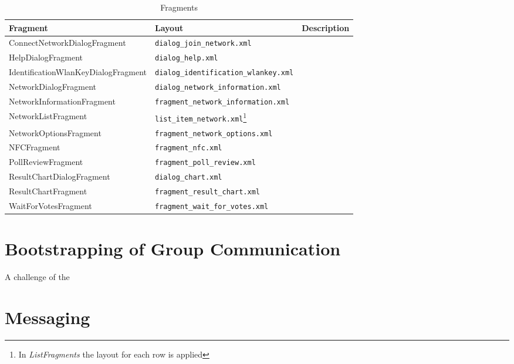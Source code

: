 \documentclass[numbers=noenddot, abstract=on, a4paper, headsepline,
footsepline, oneside, draft=off]{scrreprt}
\begin{document}
\begin{table}[htbp]
	\centering
	\begin{minipage}{\linewidth}
	\begin{tabularx}{\textwidth}{llX}
		\toprule
		\textbf{Fragment}						& \textbf{Layout}				& 	\textbf{Description}			\\
		\midrule
		ConnectNetworkDialogFragment			& \texttt{dialog\_join\_network.xml}			& 	\\
		HelpDialogFragment						& \texttt{dialog\_help.xml}						& 	\\
		IdentificationWlanKeyDialogFragment		& \texttt{dialog\_identification\_wlankey.xml}	&	\\
		NetworkDialogFragment					& \texttt{dialog\_network\_information.xml}		&	\\
		NetworkInformationFragment				& \texttt{fragment\_network\_information.xml}	&	\\
		NetworkListFragment						& \texttt{list\_item\_network.xml}\footnote{In
		\emph{ListFragments} the layout for each row is applied} 								&	\\
		NetworkOptionsFragment					& \texttt{fragment\_network\_options.xml}		& 	\\
		NFCFragment								& \texttt{fragment\_nfc.xml}					&	\\
		PollReviewFragment						& \texttt{fragment\_poll\_review.xml}			&	\\
		ResultChartDialogFragment				& \texttt{dialog\_chart.xml}					&	\\
		ResultChartFragment						& \texttt{fragment\_result\_chart.xml}			&	\\
		WaitForVotesFragment					& \texttt{fragment\_wait\_for\_votes.xml}		&	\\
		\bottomrule
	\end{tabularx}
	\end{minipage}
	\caption{Fragments}
	\label{tab:fragments}
\end{table}

\section{Bootstrapping of Group Communication}
\label{sec:bootstraping}
A challenge of the 


\section{Messaging}
\label{sec:messaging}
\end{document}
